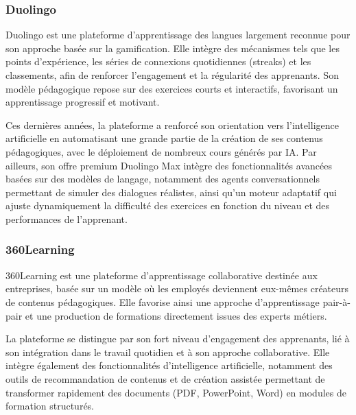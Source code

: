 


\subsubsection{Duolingo}
Duolingo \cite{duolingo} est une plateforme d’apprentissage des langues largement reconnue pour son approche basée sur la gamification. Elle intègre des mécanismes tels que les points d’expérience, les séries de connexions quotidiennes (streaks) et les classements, afin de renforcer l’engagement et la régularité des apprenants. Son modèle pédagogique repose sur des exercices courts et interactifs, favorisant un apprentissage progressif et motivant.

Ces dernières années, la plateforme a renforcé son orientation vers l’intelligence artificielle en automatisant une grande partie de la création de ses contenus pédagogiques, avec le déploiement de nombreux cours générés par IA. Par ailleurs, son offre premium Duolingo Max intègre des fonctionnalités avancées basées sur des modèles de langage, notamment des agents conversationnels permettant de simuler des dialogues réalistes, ainsi qu’un moteur adaptatif qui ajuste dynamiquement la difficulté des exercices en fonction du niveau et des performances de l’apprenant.



\subsubsection{360Learning}
360Learning \cite{learning360} est une plateforme d’apprentissage collaborative destinée aux entreprises, basée sur un modèle où les employés deviennent eux-mêmes créateurs de contenus pédagogiques. Elle favorise ainsi une approche d’apprentissage pair-à-pair et une production de formations directement issues des experts métiers.

La plateforme se distingue par son fort niveau d’engagement des apprenants, lié à son intégration dans le travail quotidien et à son approche collaborative. Elle intègre également des fonctionnalités d’intelligence artificielle, notamment des outils de recommandation de contenus et de création assistée permettant de transformer rapidement des documents (PDF, PowerPoint, Word) en modules de formation structurés.

